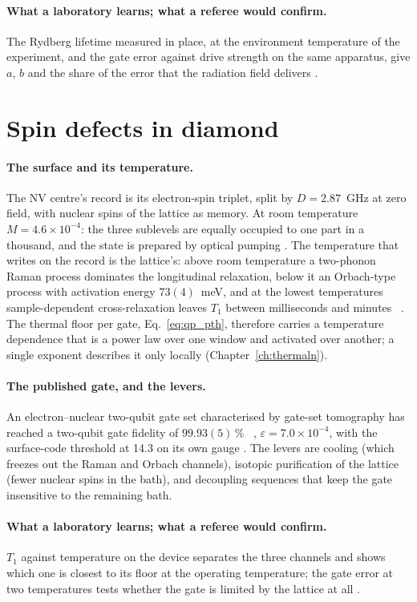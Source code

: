 \paragraph{What a laboratory learns; what a referee would confirm.} The Rydberg lifetime measured in place, at the environment temperature
of the experiment, and the gate error against drive strength on the same apparatus, give $a$, $b$ and the share of the error that the
radiation field delivers \interp.

\section{Spin defects in diamond}\label{sec:qp_nv}
\paragraph{The surface and its temperature.} The NV centre's record is its electron-spin triplet, split by $D=2.87$~GHz at zero field,
with nuclear spins of the lattice as memory. At room temperature $M=4.6\times10^{-4}$: the three sublevels are equally occupied to one part in
a thousand, and the state is prepared by optical pumping \calc. The temperature that writes on the record is the lattice's: above room
temperature a two-phonon Raman process dominates the longitudinal relaxation, below it an Orbach-type process with activation energy
$73(4)$~meV, and at the lowest temperatures sample-dependent cross-relaxation leaves $T_1$ between milliseconds and minutes~\cite{Jarmola2012}
\observed. The thermal floor per gate, Eq.~\eqref{eq:qp_pth}, therefore carries a temperature dependence that is a power law over one window
and activated over another; a single exponent describes it only locally (Chapter~\ref{ch:thermaln}).

\paragraph{The published gate, and the levers.} An electron--nuclear two-qubit gate set characterised by gate-set tomography has reached a
two-qubit gate fidelity of $99.93(5)$\,\%~\cite{Bartling2025} \observed, $\varepsilon=7.0\times10^{-4}$, with the surface-code threshold at 14.3
on its own gauge \calc. The levers are cooling (which freezes out the Raman and Orbach channels), isotopic purification of the lattice (fewer
nuclear spins in the bath), and decoupling sequences that keep the gate insensitive to the remaining bath.

\paragraph{What a laboratory learns; what a referee would confirm.} $T_1$ against temperature on the device separates the three channels and
shows which one is closest to its floor at the operating temperature; the gate error at two temperatures tests whether the gate is limited
by the lattice at all \interp.

